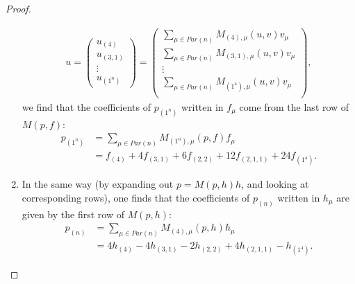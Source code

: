 \documentclass[12pt]{extarticle}
\newcommand{\<}{\langle}
\renewcommand{\>}{\rangle}
\theoremstyle{definition}
\begin{document}
\begin{proof}
\begin{enumerate}
\begin{align*}
      u
      =
      \begin{pmatrix}
        u_{(4)} \\
        u_{(3,1)} \\
        \vdots \\
        u_{(1^n)}   
      \end{pmatrix}
      =
      \begin{pmatrix}
        \sum\limits_{\mu \in Par(n)} M_{(4),\mu}(u,v) v_{\mu} \\
        \sum\limits_{\mu \in Par(n)} M_{(3,1),\mu}(u,v) v_{\mu} \\
        \vdots \\
        \sum\limits_{\mu \in Par(n)} M_{(1^4),\mu}(u,v) v_{\mu} \\
      \end{pmatrix},
    \end{align*}
    we find that the coefficients of $p_{(1^n)}$ written in $f_{\mu}$ come from the last row of $M(p,f)$:
    \begin{align*}
      p_{(1^n)}
      &=
      \sum\limits_{\mu \in Par(n)} M_{(1^n),\mu}(p,f) f_{\mu} \\
      &=
      f_{(4)} + 4f_{(3,1)} + 6f_{(2,2)} + 12f_{(2,1,1)} + 24f_{(1^4)}.
    \end{align*}
  \item
    In the same way (by expanding out $p=M(p,h)h$, and looking at corresponding rows), one finds that the coefficients of $p_{(n)}$ written in $h_\mu$ are given by the first row of $M(p,h)$:
    \begin{align*}
      p_{(n)}
      &=
      \sum\limits_{\mu \in Par(n)} M_{(4),\mu}(p,h) h_{\mu} \\
      &=
     4h_{(4)} - 4h_{(3,1)} - 2h_{(2,2)} + 4h_{(2,1,1)} - h_{(1^4)}.      
    \end{align*}
  \end{enumerate}
\end{proof}
\end{document}
